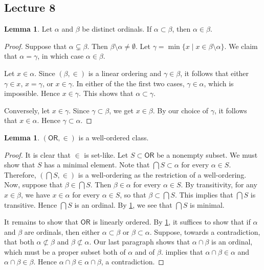 \documentclass[10pt,letterpaper,cm]{nupset}
\theoremstyle{definition}
\theoremstyle{theorem}
\newtheorem{lemma}[definition]{Lemma}
\theoremstyle{remark}
\newcommand{\1}{\mathbf{1}}
\newcommand{\0}{\vec 0}
\newcommand{\ord}{\mathsf{OR}}
\begin{document}
\subsection{Lecture 8}

\begin{lemma}\label{alt-def}
Let $\alpha$ and $\beta$ be distinct ordinals. If $\alpha \subset \beta$, then $\alpha \in \beta$.
\end{lemma}
\begin{proof}
Suppose that $\alpha \subsetneq \beta$. Then $\beta \setminus \alpha \ne \emptyset$. Let $\gamma = \min\{x \mid x \in \beta \setminus \alpha\}$. We claim that $\alpha = \gamma$, in which case $\alpha \in \beta$. 

\smallskip
Let $x \in \alpha$. Since $\left(\beta, \in\right)$ is a linear ordering and $\gamma \in \beta$, it follows that either $\gamma \in x$, $x= \gamma$, or $x \in \gamma$. In either of the the first two cases, $\gamma \in \alpha$, which is impossible. Hence $x \in \gamma$. This shows that $\alpha \subset \gamma$.  

\smallskip
 Conversely, let $x \in \gamma$. Since $\gamma \subset \beta$, we get $x \in \beta$. By our choice of $\gamma$, it follows that $x \in \alpha$. Hence $\gamma \subset \alpha$.
\end{proof}

\pagebreak

\begin{lemma} \label{ord-wo}
$\left(\ord, \in\right)$ is a well-ordered class.
\end{lemma}
\begin{proof}
It is clear that $\in$ is set-like. Let $S \subset \ord$ be a nonempty subset. We must show that $S$ has a minimal element. Note that $\bigcap{S} \subset \alpha$ for every $\alpha \in S$. Therefore, $\left(\bigcap{S}, \in\right)$ is a  well-ordering as the restriction of a well-ordering. Now, suppose that $\beta \in \bigcap{S}$. Then $\beta \in \alpha$ for every $\alpha \in S$. By transitivity, for any $x\in \beta$, we have  $x \in \alpha$ for every $\alpha \in S$, so that $\beta \subset \bigcap{S}$. This implies that $\bigcap{S}$ is transitive. Hence $\bigcap{S}$ is an ordinal. By \cref{alt-def}, we see that $\bigcap{S}$ is minimal. 

\smallskip

It remains to show that $\ord$ is linearly ordered. By \cref{alt-def}, it suffices to show that if $\alpha$ and $\beta$ are ordinals, then either $\alpha \subset \beta$ or $\beta \subset \alpha$. Suppose, towards a contradiction, that  both $\alpha \not \subset \beta$ and $\beta \not \subset \alpha$. Our last paragraph shows that $\alpha \cap \beta$ is an ordinal, which must be a proper subset both of $\alpha$ and of $\beta$.  implies that $\alpha \cap \beta \in \alpha$ and $\alpha \cap \beta \in \beta$. Hence $\alpha \cap \beta \in \alpha \cap \beta$, a contradiction. 
\end{proof}
\end{document}
